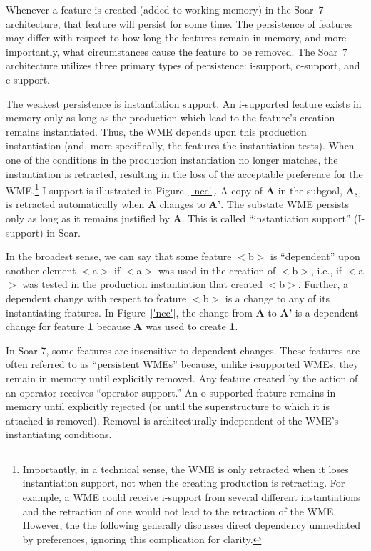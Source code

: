 Whenever a feature is created (added to working memory) in the Soar~7
architecture, that feature will persist for some time.  The
persistence of features may differ with respect to how long the
features remain in memory, and more importantly, what circumstances
cause the feature to be removed.  The Soar~7 architecture utilizes
three primary types of persistence: i-support, o-support, and
c-support.

The weakest persistence is instantiation support.  An i-supported
feature exists in memory only as long as the production which lead to
the feature's creation remains instantiated.  Thus, the WME depends
upon this production instantiation (and, more specifically, the
features the instantiation tests).  When one of the conditions in the
production instantiation no longer matches, the instantiation is
retracted, resulting in the loss of the acceptable preference for the
WME.\footnote{Importantly, in a technical sense, the WME is only
retracted when it loses instantiation support, not when the creating
production is retracting.  For example, a WME could receive i-support
from several different instantiations and the retraction of one would
not lead to the retraction of the WME.  However, the the following
generally discusses direct dependency unmediated by preferences,
ignoring this complication for clarity.}  I-support is illustrated in
Figure~\ref{'ncc'}. A copy of {\bf A} in the subgoal, {\bf A$_s$}, is
retracted automatically when {\bf A} changes to {\bf A'}.  The
substate WME persists only as long as it remains justified by {\bf A}.
This is called ``instantiation support'' (I-support) in
Soar.

In the broadest sense, we can say that some feature $<$b$>$ is
``dependent'' upon another element $<$a$>$ if $<$a$>$ was used in the
creation of $<$b$>$, i.e., if $<$a$>$ was tested in the production
instantiation that created $<$b$>$.  Further, a dependent change with
respect to feature $<$b$>$ is a change to any of its instantiating
features.  In Figure~\ref{'ncc'}, the change from {\bf A} to {\bf A'}
is a dependent change for feature {\bf 1} because {\bf A} was used to
create {\bf 1}.

In Soar 7, some features are insensitive to dependent changes.  These
features are often referred to as ``persistent WMEs'' because, unlike
i-supported WMEs, they remain in memory until explicitly removed. Any feature created by the action of an operator
receives ``operator support.''  An o-supported feature remains in
memory until explicitly rejected (or until the superstructure to which
it is attached is removed).  Removal is architecturally
independent of the WME's instantiating conditions.

